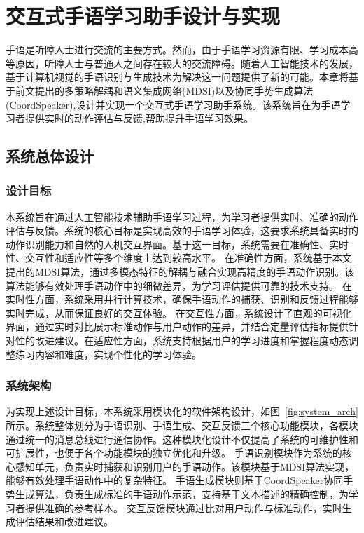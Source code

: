 
\chapter{交互式手语学习助手设计与实现}
手语是听障人士进行交流的主要方式。然而，由于手语学习资源有限、学习成本高等原因，听障人士与普通人之间存在较大的交流障碍。随着人工智能技术的发展，基于计算机视觉的手语识别与生成技术为解决这一问题提供了新的可能。本章将基于前文提出的多策略解耦和语义集成网络(MDSI)以及协同手势生成算法(CoordSpeaker),设计并实现一个交互式手语学习助手系统。该系统旨在为手语学习者提供实时的动作评估与反馈,帮助提升手语学习效果。

\section{系统总体设计}

\subsection{设计目标}
本系统旨在通过人工智能技术辅助手语学习过程，为学习者提供实时、准确的动作评估与反馈。系统的核心目标是实现高效的手语学习体验，这要求系统具备实时的动作识别能力和自然的人机交互界面。基于这一目标，系统需要在准确性、实时性、交互性和适应性等多个维度上达到较高水平。
在准确性方面，系统基于本文提出的MDSI算法，通过多模态特征的解耦与融合实现高精度的手语动作识别。该算法能够有效处理手语动作中的细微差异，为学习评估提供可靠的技术支持。
在实时性方面，系统采用并行计算技术，确保手语动作的捕获、识别和反馈过程能够实时完成，从而保证良好的交互体验。
在交互性方面，系统设计了直观的可视化界面，通过实时对比展示标准动作与用户动作的差异，并结合定量评估指标提供针对性的改进建议。在适应性方面，系统支持根据用户的学习进度和掌握程度动态调整练习内容和难度，实现个性化的学习体验。

\subsection{系统架构}
为实现上述设计目标，本系统采用模块化的软件架构设计，如图~\ref{fig:system_arch}所示。系统整体划分为手语识别、手语生成、交互反馈三个核心功能模块，各模块通过统一的消息总线进行通信协作。这种模块化设计不仅提高了系统的可维护性和可扩展性，也便于各个功能模块的独立优化和升级。
手语识别模块作为系统的核心感知单元，负责实时捕获和识别用户的手语动作。该模块基于MDSI算法实现，能够有效处理手语动作中的复杂特征。
手语生成模块则基于CoordSpeaker协同手势生成算法，负责生成标准的手语动作示范，支持基于文本描述的精确控制，为学习者提供准确的参考样本。
交互反馈模块通过比对用户动作与标准动作，实时生成评估结果和改进建议。%



